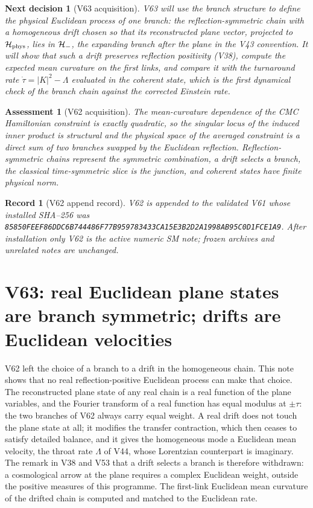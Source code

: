 \documentclass[11pt]{article}
\newtheorem{decision}[theorem]{Next decision}
\newtheorem{assessment}[theorem]{Assessment}
\newtheorem{record}[theorem]{Record}
\theoremstyle{remark}
\begin{document}
\begin{decision}[V63 acquisition]
\label{dec:v19v62-next}
V63 will use the branch structure to define the physical Euclidean
process of one branch: the reflection-symmetric chain with a
homogeneous drift chosen so that its reconstructed plane vector,
projected to \({\cal H}_{\rm phys}\), lies in \({\cal H}_-\), the
expanding branch after the plane in the V43 convention.  It will show
that such a drift preserves reflection positivity (V38), compute the
expected mean curvature on the first links, and compare it with the
turnaround rate \(\dot\tau=|K|^2-\Lambda\) evaluated in the coherent
state, which is the first dynamical check of the branch chain against
the corrected Einstein rate.
\end{decision}

\begin{assessment}[V62 acquisition]
\label{ass:v19v62}
The mean-curvature dependence of the CMC Hamiltonian constraint is
exactly quadratic, so the singular locus of the induced inner product
is structural and the physical space of the averaged constraint is a
direct sum of two branches swapped by the Euclidean reflection.
Reflection-symmetric chains represent the symmetric combination, a
drift selects a branch, the classical time-symmetric slice is the
junction, and coherent states have finite physical norm.
\end{assessment}

\begin{record}[V62 append record]
\label{rec:v19v62}
V62 is appended to the validated V61 whose installed SHA--256 was
\texttt{85850FEEF86DDC6B744486F77B959783433CA15E3B2D2A1998AB95C0D1FCE1A9}.
After installation only V62 is the active numeric SM note; frozen
archives and unrelated notes are unchanged.
\end{record}


\section{V63: real Euclidean plane states are branch symmetric; drifts are Euclidean velocities}
\label{sec:v19v63}

V62 left the choice of a branch to a drift in the homogeneous chain.
This note shows that no real reflection-positive Euclidean process can
make that choice.  The reconstructed plane state of any real chain is a
real function of the plane variables, and the Fourier transform of a
real function has equal modulus at \(\pm\tau\): the two branches of
V62 always carry equal weight.  A real drift does not touch the plane
state at all; it modifies the transfer contraction, which then ceases
to satisfy detailed balance, and it gives the homogeneous mode a
Euclidean mean velocity, the throat rate \(\Lambda\) of V44, whose
Lorentzian counterpart is imaginary.  The remark in V38 and V53 that a
drift selects a branch is therefore withdrawn: a cosmological arrow at
the plane requires a complex Euclidean weight, outside the positive
measures of this programme.  The first-link Euclidean mean curvature of
the drifted chain is computed and matched to the Euclidean rate.
\end{document}
